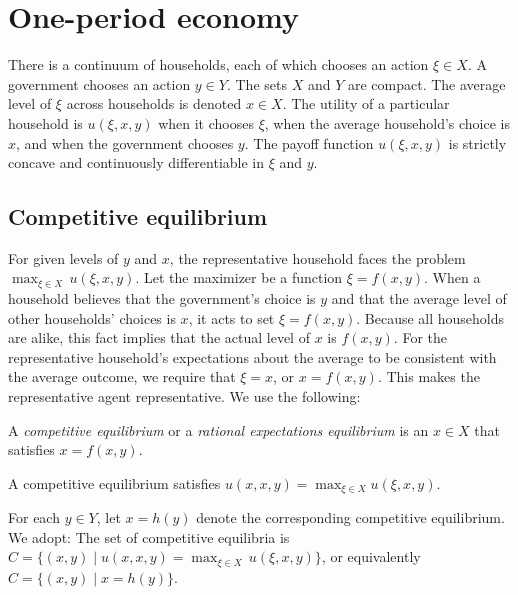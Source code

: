 \section{One-period economy}

There is a continuum of households, each of which chooses an action
$\xi \in X$.  A government chooses an action $y\in Y$.
The sets $X$ and $Y$ are compact. The average level
of $\xi$ across households is denoted $x \in X$.  The utility
of a particular household
is $u(\xi,x,y)$
when it chooses $\xi$, when the average
household's choice is $x$, and when the government chooses $y$.
  The payoff function $u(\xi,x,y)$ is
strictly concave and continuously differentiable in $\xi$ and $y$.

\newpage

\subsection{Competitive equilibrium}

For given levels of $y$ and $x$, the representative household
faces the problem\ $\max_{\xi\in X}\,  u(\xi,x,y)$.  Let the
maximizer be a function $\xi = f(x,y)$.  When a household believes
that the government's choice is $y$ and that the average
level of other households' choices is $x$, it acts to set
$\xi = f(x,y)$.  Because all households are alike, this fact implies
that the actual level of $x$ is $f(x,y)$.  For the representative household's expectations about
the average to be consistent with the average outcome, we require
that $\xi=x$, or $x=f(x,y)$. This makes the representative
agent representative.   We use the following:

\medskip{} A {\it competitive equilibrium\/} or a {\it
rational expectations equilibrium\/} is
an $x\in X$ that satisfies $x=f (x,y)$.

\medskip\noindent
A competitive equilibrium satisfies $u(x,x,y) = \max_{\xi \in X}
u(\xi,x,y)$.

For each $y\in Y$, let $x=h(y)$ denote the corresponding competitive
equilibrium.  We  adopt:
\medskip{}  The set of competitive equilibria is
$C=\{ (x,y)\mid u(x,x,y) = \max_{\xi\in X}\,
u(\xi,x,y)\}$, or equivalently $C=\{ (x,y) \mid x= h(y)\}$.

